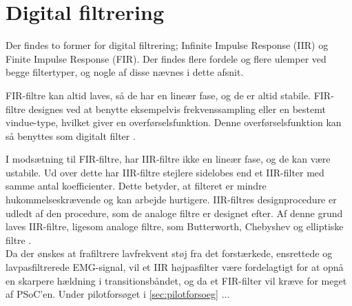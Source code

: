 \section{Digital filtrering}

Der findes to former for digital filtrering; Infinite Impulse Response (IIR) og Finite Impulse Response (FIR). Der findes flere fordele og flere ulemper ved begge filtertyper, og nogle af disse nævnes i dette afsnit\citep{blandford2012}.

FIR-filtre kan altid laves, så de har en lineær fase, og de er altid stabile. FIR-filtre designes ved at benytte eksempelvis frekvenssampling eller en bestemt vindue-type, hvilket giver en overførselsfunktion. Denne overførselsfunktion kan så benyttes som digitalt filter \citep{blandford2012}. 

I modsætning til FIR-filtre, har IIR-filtre ikke en lineær fase, og de kan være ustabile. Ud over dette har IIR-filtre stejlere sidelobes end et IIR-filter med samme antal koefficienter. Dette betyder, at filteret er mindre hukommelseskrævende og kan arbejde hurtigere. IIR-filtres designprocedure er udledt af den procedure, som de analoge filtre er designet efter. Af denne grund laves IIR-filtre, ligesom analoge filtre, som Butterworth, Chebyshev og elliptiske filtre \citep{blandford2012}. 
\\

Da der ønskes at frafiltrere lavfrekvent støj fra det forstærkede, ensrettede og lavpasfiltrerede EMG-signal, vil et IIR højpasfilter være fordelagtigt for at opnå en skarpere hældning i transitionsbåndet, og da et FIR-filter vil kræve for meget af PSoC'en. Under pilotforsøget i \autoref{sec:pilotforsoeg} ...
